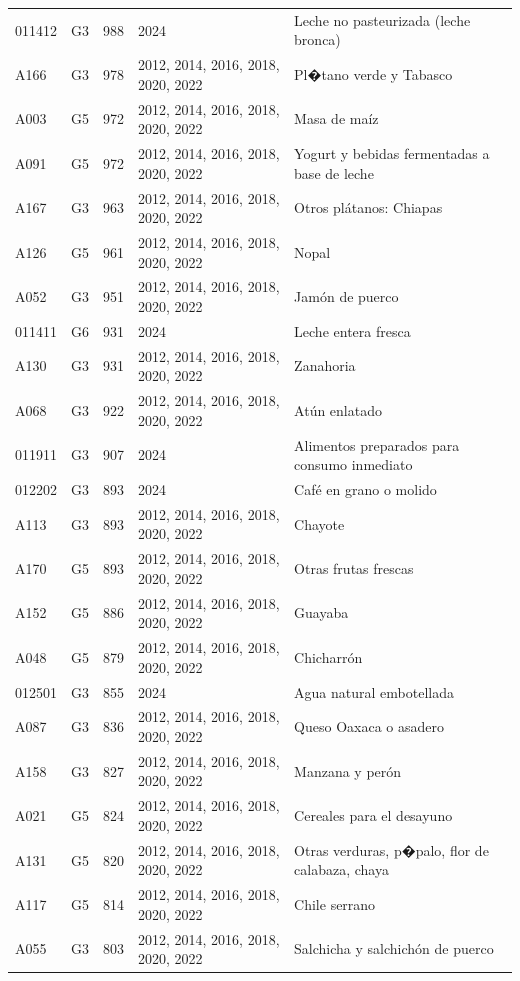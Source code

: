 \begin{table}[ht]
\begin{tabular}{llrll}
  011412 & G3 & 988 & 2024 & Leche no pasteurizada (leche bronca) \\ 
  A166 & G3 & 978 & 2012, 2014, 2016, 2018, 2020, 2022 & Pl�tano verde y Tabasco \\ 
  A003 & G5 & 972 & 2012, 2014, 2016, 2018, 2020, 2022 & Masa de maíz \\ 
  A091 & G5 & 972 & 2012, 2014, 2016, 2018, 2020, 2022 & Yogurt y bebidas fermentadas a base de leche \\ 
  A167 & G3 & 963 & 2012, 2014, 2016, 2018, 2020, 2022 & Otros plátanos: Chiapas \\ 
  A126 & G5 & 961 & 2012, 2014, 2016, 2018, 2020, 2022 & Nopal \\ 
  A052 & G3 & 951 & 2012, 2014, 2016, 2018, 2020, 2022 & Jamón de puerco \\ 
  011411 & G6 & 931 & 2024 & Leche entera fresca \\ 
  A130 & G3 & 931 & 2012, 2014, 2016, 2018, 2020, 2022 & Zanahoria \\ 
  A068 & G3 & 922 & 2012, 2014, 2016, 2018, 2020, 2022 & Atún enlatado \\ 
  011911 & G3 & 907 & 2024 & Alimentos preparados para consumo inmediato \\ 
  012202 & G3 & 893 & 2024 & Café en grano o molido \\ 
  A113 & G3 & 893 & 2012, 2014, 2016, 2018, 2020, 2022 & Chayote \\ 
  A170 & G5 & 893 & 2012, 2014, 2016, 2018, 2020, 2022 & Otras frutas frescas \\ 
  A152 & G5 & 886 & 2012, 2014, 2016, 2018, 2020, 2022 & Guayaba \\ 
  A048 & G5 & 879 & 2012, 2014, 2016, 2018, 2020, 2022 & Chicharrón \\ 
  012501 & G3 & 855 & 2024 & Agua natural embotellada \\ 
  A087 & G3 & 836 & 2012, 2014, 2016, 2018, 2020, 2022 & Queso Oaxaca o asadero \\ 
  A158 & G3 & 827 & 2012, 2014, 2016, 2018, 2020, 2022 & Manzana y perón \\ 
  A021 & G5 & 824 & 2012, 2014, 2016, 2018, 2020, 2022 & Cereales para el desayuno \\ 
  A131 & G5 & 820 & 2012, 2014, 2016, 2018, 2020, 2022 & Otras verduras, p�palo, flor de calabaza, chaya \\ 
  A117 & G5 & 814 & 2012, 2014, 2016, 2018, 2020, 2022 & Chile serrano \\ 
  A055 & G3 & 803 & 2012, 2014, 2016, 2018, 2020, 2022 & Salchicha y salchichón de puerco \\ 

\end{tabular}
\end{table}
